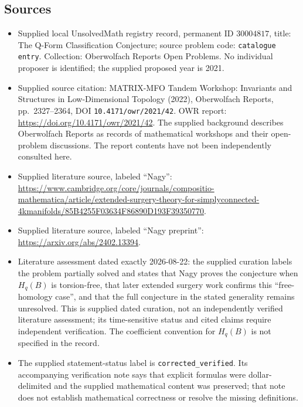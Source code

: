 \documentclass[11pt]{article}
\begin{document}
\subsection{Sources}
\begin{itemize}
\item Supplied local UnsolvedMath registry record, permanent ID \(30004817\), title: The Q-Form Classification Conjecture; source problem code: \texttt{catalogue entry}. Collection: Oberwolfach Reports Open Problems. No individual proposer is identified; the supplied proposed year is 2021.
\item Supplied source citation: MATRIX-MFO Tandem Workshop: Invariants and Structures in Low-Dimensional Topology (2022), Oberwolfach Reports, pp.\ 2327--2364, DOI \texttt{10.4171/owr/2021/42}. OWR report: \url{https://doi.org/10.4171/owr/2021/42}. The supplied background describes Oberwolfach Reports as records of mathematical workshops and their open-problem discussions. The report contents have not been independently consulted here.
\item Supplied literature source, labeled ``Nagy'': \url{https://www.cambridge.org/core/journals/compositio-mathematica/article/extended-surgery-theory-for-simplyconnected-4kmanifolds/85B4255F03634F86890D193F39350770}.
\item Supplied literature source, labeled ``Nagy preprint'': \url{https://arxiv.org/abs/2402.13394}.
\item Literature assessment dated exactly 2026-08-22: the supplied curation labels the problem partially solved and states that Nagy proves the conjecture when \(H_q(B)\) is torsion-free, that later extended surgery work confirms this ``free-homology case'', and that the full conjecture in the stated generality remains unresolved. This is supplied dated curation, not an independently verified literature assessment; its time-sensitive status and cited claims require independent verification. The coefficient convention for \(H_q(B)\) is not specified in the record.
\item The supplied statement-status label is \texttt{corrected\_verified}. Its accompanying verification note says that explicit formulas were dollar-delimited and the supplied mathematical content was preserved; that note does not establish mathematical correctness or resolve the missing definitions.
\end{itemize}
\end{document}

